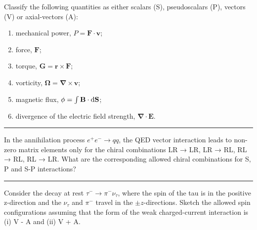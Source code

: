 \begin{problem}{11.3}
Classify the following quantities as either scalars (S), pseudoscalars (P), vectors (V) or axial-vectors (A):

\begin{enumerate}[label=(\alph*)]
    \item mechanical power, $P=\boldsymbol{F\cdot v}$;
    \item force, $\mathbf{F}$;
    \item torque, $\mathbf{G}=\boldsymbol{r\times F}$;
    \item vorticity, $\boldsymbol{\Omega}=\boldsymbol{\nabla \times v}$;
    \item magnetic flux, $\phi = \int \mathbf{B}\cdot \mathop{}\!\mathrm{d}\mathbf{S}$;
    \item divergence of the electric field strength, $\boldsymbol{\nabla \cdot E}$.
\end{enumerate}
\end{problem}
\begin{solution}

\end{solution}

\noindent\rule{7in}{1.5pt}


\begin{problem}{11.4}
In the annihilation process $e^+e^- \to qq$, the QED vector interaction leads to non-zero matrix elements only for the chiral combinations LR → LR, LR → RL, RL → RL, RL → LR. What are the corresponding allowed chiral combinations for S, P and S-P interactions?
\end{problem}
\begin{solution}

\end{solution}

\noindent\rule{7in}{1.5pt}


\begin{problem}{11.5}
Consider the decay at rest $\tau^-\to\pi^-\nu_\tau$, where the spin of the tau is in the positive z-direction and the $\nu_\tau$ and $\pi^-$ travel in the $\pm z$-directions. Sketch the allowed spin configurations assuming that the form of the weak charged-current interaction is (i) V - A and (ii) V + A.
\end{problem}
\begin{solution}

\end{solution}

